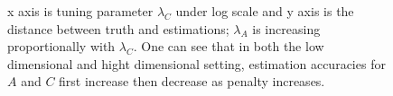 \documentclass[fleqn,12pt]{article}
\begin{document}
\begin{figure}
\centering
{}
\caption{x axis is tuning parameter $\lambda_C$ under log scale and y axis is the distance between truth and estimations; $\lambda_A$ is increasing proportionally with $\lambda_C$. One can see that in both the low dimensional and hight dimensional setting, estimation accuracies for $A$ and $C$ first increase then decrease as penalty increases.}
\label{fig:low-high-d-sim}
\end{figure}
\end{document}
